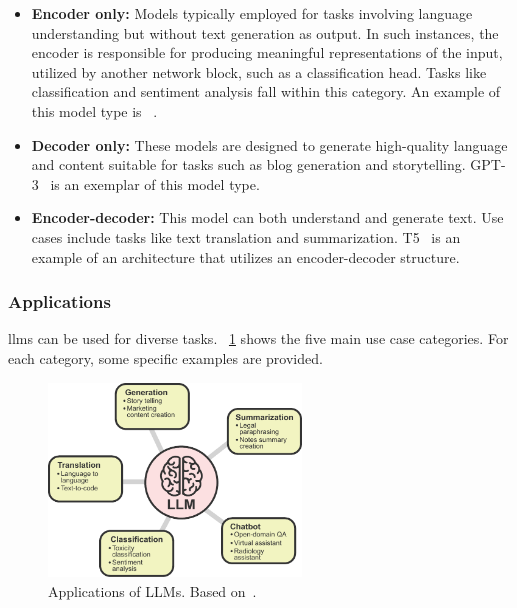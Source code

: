 \begin{itemize}
    \item \textbf{Encoder only:} Models typically employed for tasks involving language understanding but without text generation as output. In such instances, the encoder is responsible for producing meaningful representations of the input, utilized by another network block, such as a classification head. Tasks like classification and sentiment analysis fall within this category. An example of this model type is ~\cite{devlin2018bert}.

    \item \textbf{Decoder only:} These models are designed to generate high-quality language and content suitable for tasks such as blog generation and storytelling. GPT-3~\cite{brown2020language} is an exemplar of this model type. 

    \item \textbf{Encoder-decoder:} This model can both understand and generate text. Use cases include tasks like text translation and summarization. T5~\cite{raffel2020exploring} is an example of an architecture that utilizes an encoder-decoder structure.
\end{itemize}

\subsubsection{Applications}

\glspl{llm} can be used for diverse tasks. \fig~\ref{fig:llm_applications} shows the five main use case categories. For each category, some specific examples are provided. 

\begin{figure}[!ht]
\begin{center}
\includegraphics[width=0.6\textwidth]{Figures/Background/llm_applications.pdf}
\caption{Applications of LLMs. Based on~\cite{nvidiaWhatLarge}.}
\label{fig:llm_applications}
\end{center}
\end{figure}

